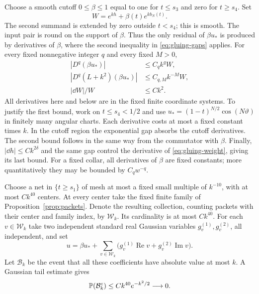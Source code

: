 Choose a smooth cutoff $0\le\beta\le1$ equal to one for $t\le s_3$
and zero for $t\ge s_4$. Set
\begin{equation}\label{eq:gluing-weight}
 W=e^{kh}+\beta(t)e^{kb_N(t)}.
\end{equation}
The second summand is extended by zero outside $t<s_4$; this is
smooth. The input pair is round on the support of $\beta$. Thus the
only residual of $\beta u_*$ is produced by derivatives of $\beta$,
where the second inequality in \eqref{eq:gluing-gaps} applies. For
every fixed nonnegative integer $q$ and every fixed $M>0$,
\begin{equation}\label{eq:beam-weighted-bounds}
 \begin{split}
 |D^q(\beta u_*)|&\le C_q k^qW,\\
 |D^q(L+k^2)(\beta u_*)|&\le C_{q,M}k^{-M}W,\\
 |\dd W|/W&\le Ck^2 .
 \end{split}
\end{equation}
All derivatives here and below are in the fixed finite coordinate
systems. To justify the first bound, work on $t\le s_4<1/2$ and use
$u_*=(1-t)^{N/2}\cos(N\vartheta)$ in finitely many angular charts.
Each derivative costs at most a fixed constant times $k$. In the
cutoff region the exponential gap absorbs the cutoff derivatives.
The second bound follows in the same way from the commutator with
$\beta$. Finally, $|\dd h|\le Ck^{2\delta}$ and the same gap control
the derivative of \eqref{eq:gluing-weight}, giving its last bound.
For a fixed collar, all derivatives of $\beta$ are fixed constants;
more quantitatively they may be bounded by $C_qw^{-q}$.

Choose a net in $\{t\ge s_1\}$ of mesh at most a fixed small multiple
of $k^{-10}$, with at most $Ck^{40}$ centers. At every center take the
fixed finite family of Proposition~\ref{prop:packets}. Denote the
resulting collection, counting packets with their center and family
index, by $\mathcal W_k$. Its cardinality is at most $Ck^{40}$.
For each $v\in\mathcal W_k$ take two independent standard real
Gaussian variables $g_v^{(1)},g_v^{(2)}$, all independent, and set
\begin{equation}\label{eq:gaussian-sum}
 u=\beta u_*+
 \sum_{v\in\mathcal W_k}
 \bigl(g_v^{(1)}\operatorname{Re}v+
       g_v^{(2)}\operatorname{Im}v\bigr).
\end{equation}
Let $\mathcal B_k$ be the event that all these coefficients have
absolute value at most $k$. A Gaussian tail estimate gives
\begin{equation}\label{eq:coefficient-event}
 \mathbb P(\mathcal B_k^c)\le Ck^{40}e^{-k^2/2}\longrightarrow0.
\end{equation}

